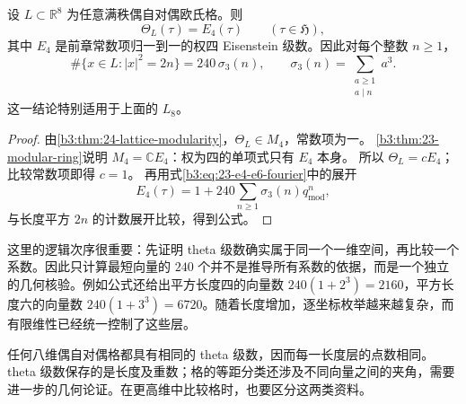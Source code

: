 \begin{corollary}[八维偶自对偶格的全部表示数]\label{b3:cor:24-e8-eisenstein}
设 \(L\subset\mathbb R^8\) 为任意满秩偶自对偶欧氏格。则
\[
 \Theta_L(\tau)=E_4(\tau)\qquad(\tau\in\mathfrak H),
\]
其中 \(E_4\) 是前章常数项归一到一的权四 Eisenstein 级数。因此对每个整数 \(n\ge1\)，
\[
 \#\{x\in L:|x|^2=2n\}=240\,\sigma_3(n),
 \qquad \sigma_3(n)=\sum_{\substack{a\ge1\\a\mid n}}a^3.
\]
这一结论特别适用于上面的 \(L_8\)。
\end{corollary}
\begin{proof}
由\cref{b3:thm:24-lattice-modularity}，\(\Theta_L\in M_4\)，常数项为一。
\cref{b3:thm:23-modular-ring}说明
\(M_4=\mathbb C E_4\)：权为四的单项式只有 \(E_4\) 本身。
所以 \(\Theta_L=cE_4\)；比较常数项即得 \(c=1\)。
再用式\eqref{b3:eq:23-e4-e6-fourier}中的展开
\[
 E_4(\tau)=1+240\sum_{n\ge1}\sigma_3(n)q_{\mathrm{mod}}^n,
\]
与长度平方 \(2n\) 的计数展开比较，得到公式。
\end{proof}

这里的逻辑次序很重要：先证明 theta 级数确实属于同一个一维空间，再比较一个系数。因此只计算最短向量的 \(240\) 个并不是推导所有系数的依据，而是一个独立的几何核验。例如公式还给出平方长度四的向量数
\(240(1+2^3)=2160\)，平方长度六的向量数
\(240(1+3^3)=6720\)。随着长度增加，逐坐标枚举越来越复杂，而有限维性已经统一控制了这些层。

\ProseParagraphBreak

任何八维偶自对偶格都具有相同的 theta 级数，因而每一长度层的点数相同。theta 级数保存的是长度及重数；格的等距分类还涉及不同向量之间的夹角，需要进一步的几何论证。在更高维中比较格时，也要区分这两类资料。
